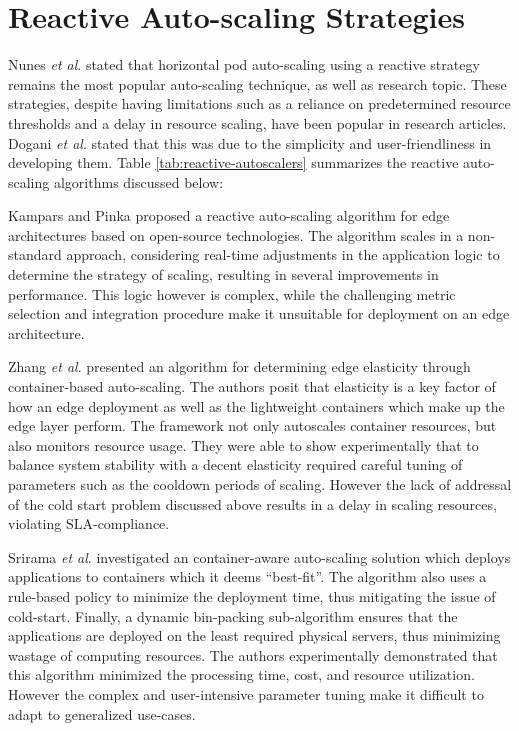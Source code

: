 \section{Reactive Auto-scaling Strategies}
\label{sec:ch3-reactive-solutions}

Nunes \textit{et al}. \cite{nunes2021state} stated that horizontal pod auto-scaling using a reactive strategy remains the most popular auto-scaling technique, as well as research topic. These strategies, despite having limitations such as a reliance on predetermined resource thresholds and a delay in resource scaling, have been popular in research articles.  Dogani \textit{et al}. \cite{dogani2023auto} stated that this was due to the simplicity and user-friendliness in developing them. Table \ref{tab:reactive-autoscalers} summarizes the reactive auto-scaling algorithms discussed below:\par

Kampars and Pinka \cite{kampars2017auto} proposed a reactive auto-scaling algorithm for edge architectures based on open-source technologies. The algorithm scales in a non-standard approach, considering real-time adjustments in the application logic to determine the strategy of scaling, resulting in several improvements in performance. This logic however is complex, while the challenging metric selection and integration procedure make it unsuitable for deployment on an edge architecture.\par

Zhang \textit{et al}. \cite{zhang2019quantifying} presented an algorithm for determining edge elasticity through container-based auto-scaling. The authors posit that elasticity is a key factor of how an edge deployment as well as the lightweight containers which make up the edge layer perform. The framework not only autoscales container resources, but also monitors resource usage. They were able to show experimentally that to balance system stability with a decent elasticity required careful tuning of parameters such as the cooldown periods of scaling. However the lack of addressal of the cold start problem discussed above results in a delay in scaling resources, violating SLA-compliance.\par

Srirama \textit{et al}. \cite{srirama2020application} investigated an container-aware auto-scaling solution which deploys applications to containers which it deems ``best-fit''. The algorithm also uses a rule-based policy to minimize the deployment time, thus mitigating the issue of cold-start. Finally, a dynamic bin-packing sub-algorithm ensures that the applications are deployed on the least required physical servers, thus minimizing wastage of computing resources. The authors experimentally demonstrated that this algorithm minimized  the processing time, cost, and resource utilization. However the complex and user-intensive parameter tuning make it difficult to adapt to generalized use-cases.\par

